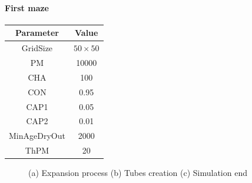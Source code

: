 \paragraph{First maze}

\begin{center}
 \begin{tabular}{||c c||} 
 \hline
 Parameter & Value \\ [0.5ex] 
 \hline\hline
 GridSize & $50 \times 50$ \\ 
 \hline
 PM & 10000 \\ 
 \hline
 CHA & 100 \\ 
 \hline
 CON & 0.95 \\ 
 \hline
 CAP1 & 0.05 \\ 
 \hline
 CAP2 & 0.01 \\ 
 \hline
 MinAgeDryOut & 2000 \\
 \hline
 ThPM & 20 \\ [1ex] 
 \hline
 \end{tabular}
\end{center}

\begin{figure}[H]
    \centering
    \caption{(a) Expansion process (b) Tubes creation (c) Simulation end}
    \label{fig:foobar}
\end{figure}

